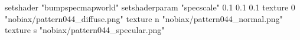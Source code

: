 setshader "bumpspecmapworld"
setshaderparam "specscale" 0.1 0.1 0.1
    texture 0 "nobiax/pattern044_diffuse.png"
    texture n "nobiax/pattern044_normal.png"
    texture s "nobiax/pattern044_specular.png"